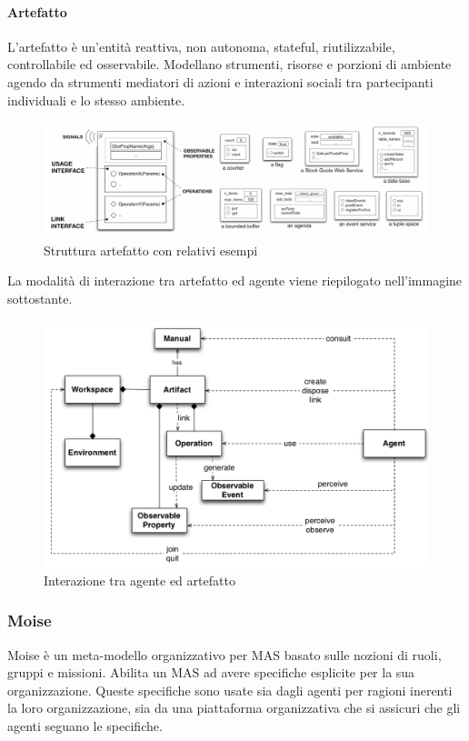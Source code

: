 \smallskip

\paragraph{Artefatto}
L'artefatto è un'entità reattiva, non autonoma, stateful, riutilizzabile, controllabile ed osservabile. Modellano strumenti, risorse e porzioni di ambiente agendo da strumenti mediatori di azioni e interazioni sociali tra partecipanti individuali e lo stesso ambiente.\cite{Omicini2008}

\begin{figure}[H]
\centering
\includegraphics[width=\linewidth]{figures/Artifact_structure_example.png}
\caption{Struttura artefatto con relativi esempi}
\end{figure}

La modalità di interazione tra artefatto ed agente viene riepilogato nell'immagine sottostante.

\begin{figure}[H]
\centering
\includegraphics[width=\linewidth]{figures/Artifact_Agent_interaction.png}
\caption{Interazione tra agente ed artefatto}
\end{figure}

\subsubsection*{Moise}
Moise è un meta-modello organizzativo per MAS basato sulle nozioni di ruoli, gruppi e missioni. Abilita un MAS ad avere specifiche esplicite per la sua organizzazione. Queste specifiche sono usate sia dagli agenti per ragioni inerenti la loro organizzazione, sia da una piattaforma organizzativa che si assicuri che gli agenti seguano le specifiche.

